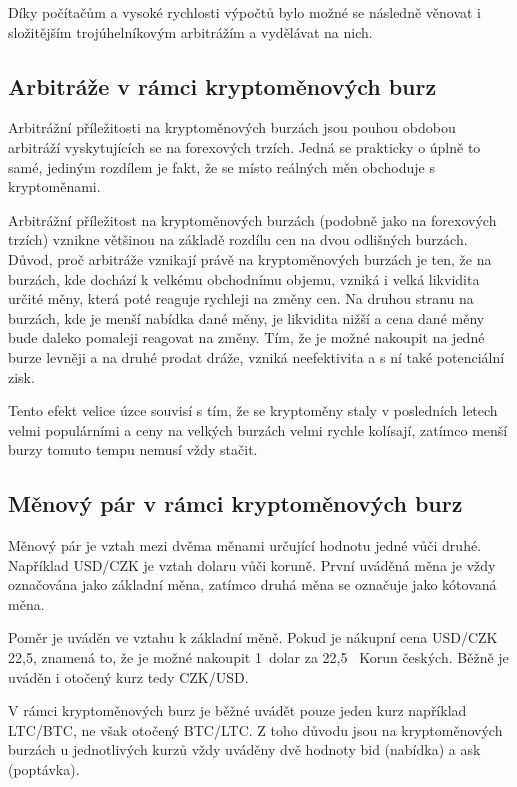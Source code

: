 \documentclass[thesis=B,czech]{FITthesis}[2019/03/21]
\begin{document}
Díky počítačům a vysoké rychlosti výpočtů bylo možné se následně věnovat i složitějším trojúhelníkovým arbitrážím a vydělávat na nich. \cite{investopedia_forex_arbitrage}

\subsection{Arbitráže v rámci kryptoměnových burz}
Arbitrážní příležitosti na kryptoměnových burzách jsou pouhou obdobou arbitráží vyskytujících se na forexových trzích. Jedná se prakticky o úplně to samé, jediným rozdílem je fakt, že se místo reálných měn obchoduje s kryptoměnami. 

Arbitrážní příležitost na kryptoměnových burzách (podobně jako na forexových trzích) vznikne většinou na základě rozdílu cen na dvou odlišných burzách. Důvod, proč arbitráže vznikají právě na kryptoměnových burzách je ten, že na burzách, kde dochází k velkému obchodnímu objemu, vzniká i velká likvidita určité měny, která poté reaguje rychleji na změny cen. Na druhou stranu na burzách, kde je menší nabídka dané měny, je likvidita nižší a cena dané měny bude daleko pomaleji reagovat na změny. Tím, že je možné nakoupit na jedné burze levněji a na druhé prodat dráže, vzniká neefektivita a s ní také potenciální zisk.

Tento efekt velice úzce souvisí s tím, že se kryptoměny staly v posledních letech velmi populárními a ceny na velkých burzách velmi rychle kolísají, zatímco menší burzy tomuto tempu nemusí vždy stačit. \cite{finder}

\subsection{Měnový pár v rámci kryptoměnových burz}
Měnový pár je vztah mezi dvěma měnami určující hodnotu jedné vůči druhé. Například USD/CZK je vztah dolaru vůči koruně. První uváděná měna je vždy označována jako základní měna, zatímco druhá měna se označuje jako kótovaná měna. \cite{Capital_menovy_par} 

Poměr je uváděn ve vztahu k základní měně. Pokud je nákupní cena USD/CZK 22,5, znamená to, že je možné nakoupit 1~dolar za 22,5~ Korun českých. Běžně je uváděn i otočený kurz tedy CZK/USD. \cite{Capital_menovy_par} 

V rámci kryptoměnových burz je běžné uvádět pouze jeden kurz například LTC/BTC, ne však otočený BTC/LTC. Z toho důvodu jsou na kryptoměnových burzách u jednotlivých kurzů vždy uváděny dvě hodnoty bid (nabídka) a ask (poptávka). 
\end{document}
